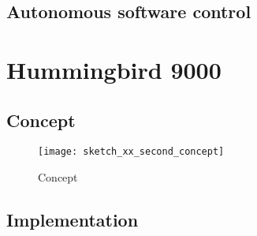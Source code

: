 \subsection{Autonomous software control}
%

\section{Hummingbird 9000}

\subsection{Concept}



\begin{figure}[h]
\centering

\texttt{[image: sketch\_xx\_second\_concept]}

\caption{Concept}
\end{figure}

\subsection{Implementation}